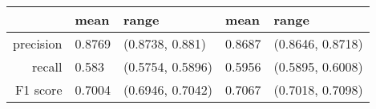\begin{table}[ht]
\centering
\begin{tabular}{rllll}
  \hline
 & mean & range & mean & range \\ 
  \hline
precision & 0.8769 & (0.8738, 0.881) & 0.8687 & (0.8646, 0.8718) \\ 
  recall & 0.583 & (0.5754, 0.5896) & 0.5956 & (0.5895, 0.6008) \\ 
  F1 score & 0.7004 & (0.6946, 0.7042) & 0.7067 & (0.7018, 0.7098) \\ 
   \hline
\end{tabular}
\end{table}
